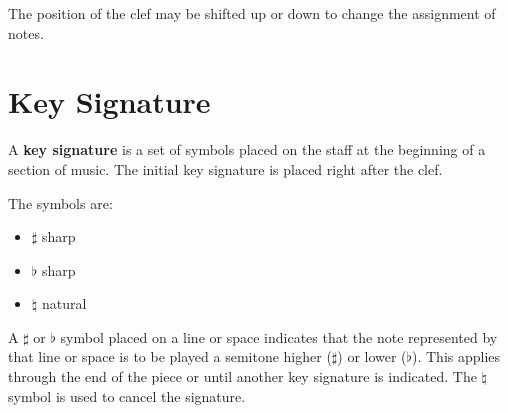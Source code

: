 \documentclass[a4paper]{article}
\begin{document}
\begin{center}
\end{center}

The position of the clef may be shifted up or down to change the assignment of notes.

\section{Key Signature}

A \textbf{key signature} is a set of symbols placed
on the staff at the beginning of a section of music.
The initial key signature is placed right after the clef.

The symbols are:

\begin{itemize}
    \item \(\sharp\) sharp
    \item \(\flat\) sharp
    \item \(\natural\) natural
\end{itemize}

A \(\sharp\) or \(\flat\) symbol placed on a line or space
indicates that the note represented by that line or space is to be played
a semitone higher (\(\sharp\)) or lower (\(\flat\)).
This applies through the end of the piece or until another key signature is indicated.
The \(\natural\) symbol is used to cancel the signature.
\end{document}
